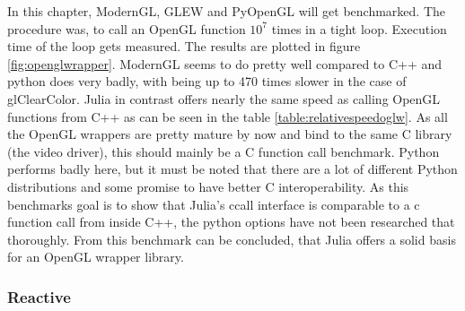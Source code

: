 In this chapter, ModernGL, GLEW and PyOpenGL will get benchmarked.
The procedure was, to call an OpenGL function $10^7$ times in a tight loop. Execution time of the loop gets measured.
The results are plotted in figure \ref{fig:openglwrapper}.
ModernGL seems to do pretty well compared to C++ and python does very badly, with being up to 470 times slower in the case of glClearColor.
Julia in contrast offers nearly the same speed as calling OpenGL functions from C++ as can be seen in the table \ref{table:relativespeedoglw}.
As all the OpenGL wrappers are pretty mature by now and bind to the same C library (the video driver), this should mainly be a C function call benchmark.
Python performs badly here, but it must be noted that there are a lot of different Python distributions and some promise to have better C interoperability.
As this benchmarks goal is to show that Julia’s ccall interface is comparable to a c function call from inside C++, the python options have not been researched that thoroughly.
From this benchmark can be concluded, that Julia offers a solid basis for an OpenGL wrapper library.


\subsubsection{Reactive}

